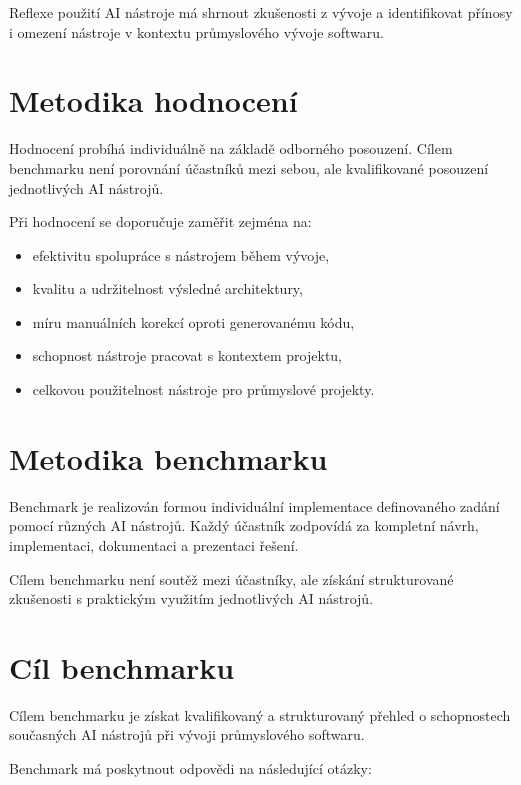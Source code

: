 \documentclass[12pt,a4paper]{article}
\begin{document}
Reflexe použití AI nástroje má shrnout zkušenosti z vývoje
a identifikovat přínosy i omezení nástroje v kontextu
průmyslového vývoje softwaru.

\section{Metodika hodnocení}

Hodnocení probíhá individuálně na základě odborného posouzení.
Cílem benchmarku není porovnání účastníků mezi sebou,
ale kvalifikované posouzení jednotlivých AI nástrojů.

Při hodnocení se doporučuje zaměřit zejména na:

\begin{itemize}
    \item efektivitu spolupráce s nástrojem během vývoje,
    \item kvalitu a udržitelnost výsledné architektury,
    \item míru manuálních korekcí oproti generovanému kódu,
    \item schopnost nástroje pracovat s kontextem projektu,
    \item celkovou použitelnost nástroje pro průmyslové projekty.
\end{itemize}

\section{Metodika benchmarku}

Benchmark je realizován formou individuální implementace
definovaného zadání pomocí různých AI nástrojů.
Každý účastník zodpovídá za kompletní návrh,
implementaci, dokumentaci a prezentaci řešení.

Cílem benchmarku není soutěž mezi účastníky,
ale získání strukturované zkušenosti
s praktickým využitím jednotlivých AI nástrojů.

\section{Cíl benchmarku}

Cílem benchmarku je získat kvalifikovaný a strukturovaný přehled
o schopnostech současných AI nástrojů při vývoji průmyslového softwaru.

Benchmark má poskytnout odpovědi na následující otázky:
\end{document}
